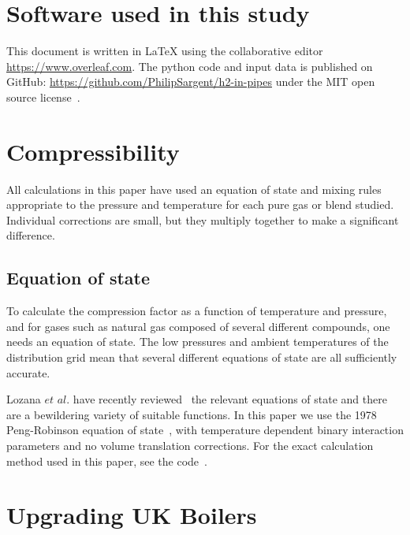 \documentclass[5p]{elsarticle} %
\begin{document}
\appendix

\section{Software used in this study}
\label{sec:oursoftware}
This document is written in \LaTeX{} using the 
collaborative  editor  \url{https://www.overleaf.com}.  The python code and input data is published on GitHub: \url{https://github.com/PhilipSargent/h2-in-pipes} under the MIT open source license~\citep{Sargents_github}.

\section{Compressibility}
\label{appendix:gasprops}
All calculations in this paper have used an equation of state and  mixing rules appropriate to the pressure and temperature for each pure gas or blend studied. Individual corrections are small, but they multiply together to make a significant difference.


\subsection{Equation of state}
\label{sec:eqnofstate}
To calculate the compression factor as a function of temperature and pressure, and for gases such as natural gas composed of several different compounds, one needs an equation of state.
The low pressures and ambient temperatures of the distribution grid mean that several different equations of state are all sufficiently accurate.

Lozana $et$ $al.$ have recently reviewed~\citep{Lozana2022}  the relevant equations of state and there are a bewildering variety of suitable functions. In this paper we use the 1978 Peng-Robinson equation of state~\citep{Tabkhi2008}, with temperature dependent binary interaction parameters and no volume translation corrections.
 For the exact calculation method used in this paper, see 
 the code~\citep{Sargents_github}. 

\section{Upgrading UK Boilers}
\label{appendix:more-boilers}
\label{appendix:h2upgrade}
\end{document}
